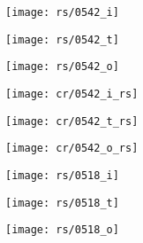 \documentclass[final]{cvpr}
\begin{document}
\begin{figure*}

	\begin{subfigure}[b]{0.32\textwidth}
                \texttt{[image: rs/0542\_i]}
        \end{subfigure}\hspace{\fill}
        \begin{subfigure}[b]{0.32\textwidth}
                \texttt{[image: rs/0542\_t]}
        \end{subfigure}\hspace{\fill}
        \begin{subfigure}[b]{0.32\textwidth}
                \texttt{[image: rs/0542\_o]}
        \end{subfigure}\hspace{\fill}
        
        \begin{subfigure}[b]{0.32\textwidth}
                \texttt{[image: cr/0542\_i\_rs]}
        \end{subfigure}\hspace{\fill}
        \begin{subfigure}[b]{0.32\textwidth}
                \texttt{[image: cr/0542\_t\_rs]}
        \end{subfigure}\hspace{\fill}
        \begin{subfigure}[b]{0.32\textwidth}
                \texttt{[image: cr/0542\_o\_rs]}
        \end{subfigure}\hspace{\fill}
	
        \begin{subfigure}[b]{0.32\textwidth}
                \texttt{[image: rs/0518\_i]}
        \end{subfigure}\hspace{\fill}
        \begin{subfigure}[b]{0.32\textwidth}
                \texttt{[image: rs/0518\_t]}
        \end{subfigure}\hspace{\fill}
        \begin{subfigure}[b]{0.32\textwidth}
                \texttt{[image: rs/0518\_o]}
        \end{subfigure}\hspace{\fill}
        

\end{figure*}
\end{document}
